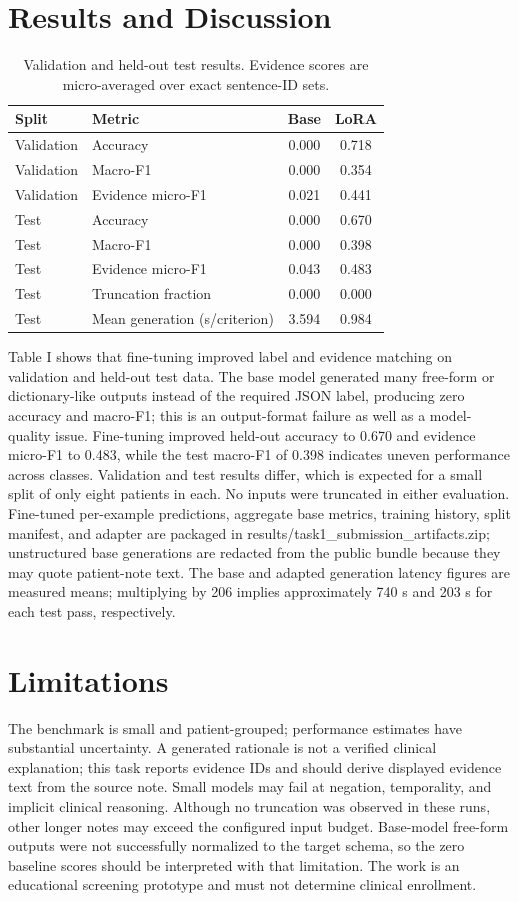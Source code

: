 \documentclass[conference]{IEEEtran}
\begin{document}
\section{Results and Discussion}
\begin{table}[t]\centering\caption{Validation and held-out test results. Evidence scores are micro-averaged over exact sentence-ID sets.}\begin{tabular}{llcc}\toprule Split & Metric & Base & LoRA\\\midrule Validation & Accuracy & 0.000 & 0.718\\Validation & Macro-F1 & 0.000 & 0.354\\Validation & Evidence micro-F1 & 0.021 & 0.441\\Test & Accuracy & 0.000 & 0.670\\Test & Macro-F1 & 0.000 & 0.398\\Test & Evidence micro-F1 & 0.043 & 0.483\\Test & Truncation fraction & 0.000 & 0.000\\Test & Mean generation (s/criterion) & 3.594 & 0.984\\\bottomrule\end{tabular}\end{table}
Table I shows that fine-tuning improved label and evidence matching on validation and held-out test data. The base model generated many free-form or dictionary-like outputs instead of the required JSON label, producing zero accuracy and macro-F1; this is an output-format failure as well as a model-quality issue. Fine-tuning improved held-out accuracy to 0.670 and evidence micro-F1 to 0.483, while the test macro-F1 of 0.398 indicates uneven performance across classes. Validation and test results differ, which is expected for a small split of only eight patients in each. No inputs were truncated in either evaluation. Fine-tuned per-example predictions, aggregate base metrics, training history, split manifest, and adapter are packaged in results/task1_submission_artifacts.zip; unstructured base generations are redacted from the public bundle because they may quote patient-note text. The base and adapted generation latency figures are measured means; multiplying by 206 implies approximately 740 s and 203 s for each test pass, respectively.
\section{Limitations}
The benchmark is small and patient-grouped; performance estimates have substantial uncertainty. A generated rationale is not a verified clinical explanation; this task reports evidence IDs and should derive displayed evidence text from the source note. Small models may fail at negation, temporality, and implicit clinical reasoning. Although no truncation was observed in these runs, other longer notes may exceed the configured input budget. Base-model free-form outputs were not successfully normalized to the target schema, so the zero baseline scores should be interpreted with that limitation. The work is an educational screening prototype and must not determine clinical enrollment.
\end{document}
